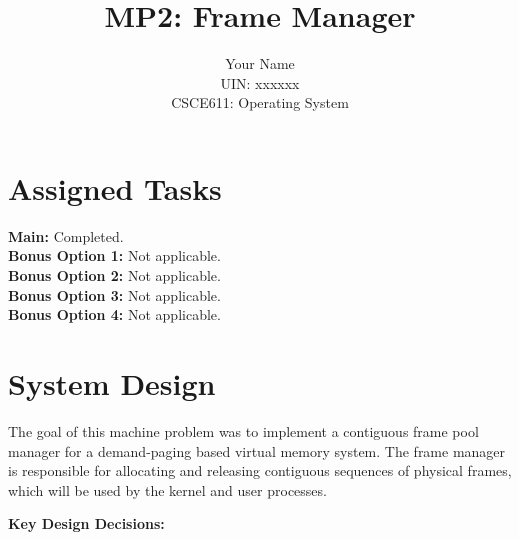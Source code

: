 \documentclass{article}
\title{MP2: Frame Manager}
\author{Your Name\\UIN: xxxxxx\\CSCE611: Operating System}
\begin{document}
\date{}
\maketitle


\section*{Assigned Tasks}

\textbf{Main:} Completed. \\
\textbf{Bonus Option 1:} Not applicable. \\
\textbf{Bonus Option 2:} Not applicable. \\
\textbf{Bonus Option 3:} Not applicable. \\
\textbf{Bonus Option 4:} Not applicable. \\

\section*{System Design}

The goal of this machine problem was to implement a contiguous frame pool manager for a demand-paging based virtual memory system. The frame manager is responsible for allocating and releasing contiguous sequences of physical frames, which will be used by the kernel and user processes.

\textbf{Key Design Decisions:}
\end{document}
